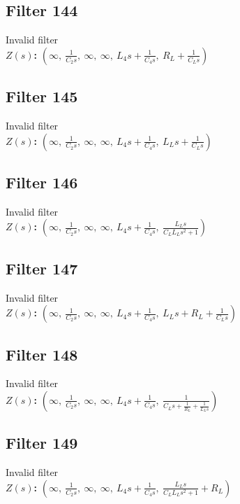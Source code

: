 \documentclass{article}
\begin{document}
\subsection*{Filter 144}
Invalid filter \\ 
\textbf{$Z(s)$:} $\left( \infty, \  \frac{1}{C_{2} s}, \  \infty, \  \infty, \  L_{4} s + \frac{1}{C_{4} s}, \  R_{L} + \frac{1}{C_{L} s}\right)$ \\ 
\subsection*{Filter 145}
Invalid filter \\ 
\textbf{$Z(s)$:} $\left( \infty, \  \frac{1}{C_{2} s}, \  \infty, \  \infty, \  L_{4} s + \frac{1}{C_{4} s}, \  L_{L} s + \frac{1}{C_{L} s}\right)$ \\ 
\subsection*{Filter 146}
Invalid filter \\ 
\textbf{$Z(s)$:} $\left( \infty, \  \frac{1}{C_{2} s}, \  \infty, \  \infty, \  L_{4} s + \frac{1}{C_{4} s}, \  \frac{L_{L} s}{C_{L} L_{L} s^{2} + 1}\right)$ \\ 
\subsection*{Filter 147}
Invalid filter \\ 
\textbf{$Z(s)$:} $\left( \infty, \  \frac{1}{C_{2} s}, \  \infty, \  \infty, \  L_{4} s + \frac{1}{C_{4} s}, \  L_{L} s + R_{L} + \frac{1}{C_{L} s}\right)$ \\ 
\subsection*{Filter 148}
Invalid filter \\ 
\textbf{$Z(s)$:} $\left( \infty, \  \frac{1}{C_{2} s}, \  \infty, \  \infty, \  L_{4} s + \frac{1}{C_{4} s}, \  \frac{1}{C_{L} s + \frac{1}{R_{L}} + \frac{1}{L_{L} s}}\right)$ \\ 
\subsection*{Filter 149}
Invalid filter \\ 
\textbf{$Z(s)$:} $\left( \infty, \  \frac{1}{C_{2} s}, \  \infty, \  \infty, \  L_{4} s + \frac{1}{C_{4} s}, \  \frac{L_{L} s}{C_{L} L_{L} s^{2} + 1} + R_{L}\right)$ \\ 
\end{document}
